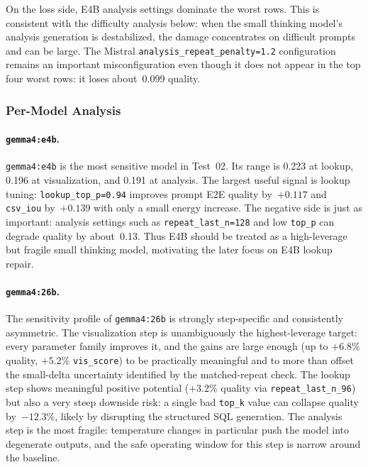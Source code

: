 On the loss side, E4B analysis settings dominate the worst rows. This is
consistent with the difficulty analysis below: when the small thinking model's
analysis generation is destabilized, the damage concentrates on difficult
prompts and can be large. The Mistral
\texttt{analysis\_repeat\_penalty=1.2} configuration remains an important
misconfiguration even though it does not appear in the top four worst rows:
it loses about~0.099 quality.

\subsubsection{Per-Model Analysis}

\paragraph{\texttt{gemma4:e4b}.}

\texttt{gemma4:e4b} is the most sensitive model in Test~02. Its range is 0.223
at lookup, 0.196 at visualization, and 0.191 at analysis. The largest useful
signal is lookup tuning: \texttt{lookup\_top\_p=0.94} improves prompt E2E
quality by~$+0.117$ and \texttt{csv\_iou} by~$+0.139$ with only a small energy
increase. The negative side is just as important: analysis settings such as
\texttt{repeat\_last\_n=128} and low \texttt{top\_p} can degrade quality by
about~0.13. Thus E4B should be treated as a high-leverage but fragile small
thinking model, motivating the later focus on E4B lookup repair.

\paragraph{\texttt{gemma4:26b}.}

The sensitivity profile of \texttt{gemma4:26b} is strongly step-specific
and consistently asymmetric. The visualization step is unambiguously the
highest-leverage target: every parameter family improves it, and the
gains are large enough (up to $+6.8\%$ quality, $+5.2\%$
\texttt{vis\_score}) to be practically meaningful and to more than
offset the small-delta uncertainty identified by the matched-repeat check. The lookup step shows
meaningful positive potential ($+3.2\%$ quality via
\texttt{repeat\_last\_n\_96}) but also a very steep downside risk: a
single bad \texttt{top\_k} value can collapse quality by~$-12.3\%$,
likely by disrupting the structured SQL generation. The analysis step is
the most fragile: temperature changes in particular push the model into
degenerate outputs, and the safe operating window for this step is
narrow around the baseline.


